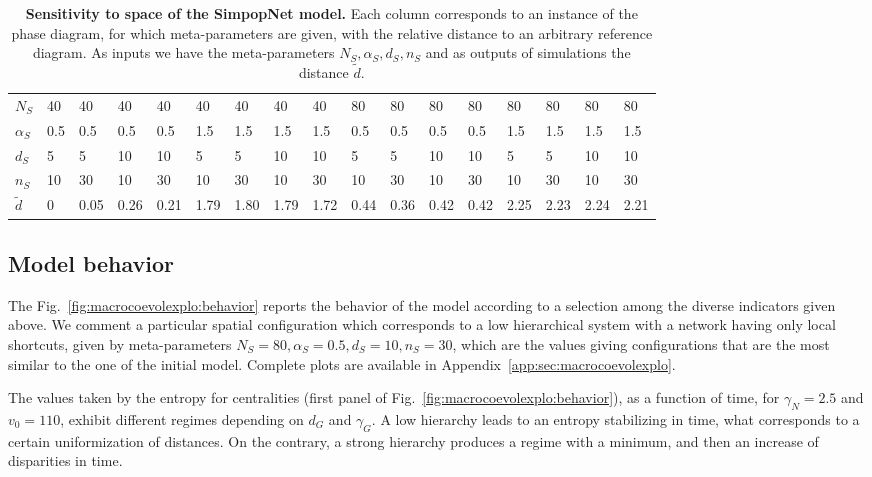 \begin{table}[!ht]
\caption{\textbf{Sensitivity to space of the SimpopNet model.} Each column corresponds to an instance of the phase diagram, for which meta-parameters are given, with the relative distance to an arbitrary reference diagram. As inputs we have the meta-parameters $N_S,\alpha_S,d_S,n_S$ and as outputs of simulations the distance $\tilde{d}$.\label{tab:macrocoevolexplo:spacematters}}
\begin{tabular}{|l|l|l|l|l|l|l|l|l|l|l|l|l|l|l|l|l|}
\hline
$N_S$ & 40 & 40 & 40 & 40 & 40 & 40 & 40 & 40 & 80 & 80 & 80 & 80 & 80 & 80 & 80 & 80\\
$\alpha_S$ & 0.5 & 0.5 & 0.5 & 0.5 & 1.5 & 1.5 & 1.5 & 1.5 & 0.5 & 0.5 & 0.5 & 0.5 & 1.5 & 1.5 & 1.5 & 1.5\\
$d_S$ & 5 & 5 & 10 & 10 & 5 & 5 & 10 & 10 & 5 & 5 & 10 & 10 & 5 & 5 & 10 & 10\\
$n_S$ & 10 & 30 & 10 & 30 & 10 & 30 & 10 & 30 & 10 & 30 & 10 & 30 & 10 & 30 & 10 & 30\\\hline
$\tilde{d}$ & 0 & 0.05 & 0.26 & 0.21 & 1.79 & 1.80 & 1.79 & 1.72 & 0.44 & 0.36 & 0.42 & 0.42 & 2.25 & 2.23 & 2.24 & 2.21\\\hline
\end{tabular}
\end{table}



\subsection{Model behavior}

The Fig.~\ref{fig:macrocoevolexplo:behavior} reports the behavior of the model according to a selection among the diverse indicators given above. We comment a particular spatial configuration which corresponds to a low hierarchical system with a network having only local shortcuts, given by meta-parameters $N_S=80,\alpha_S=0.5,d_S=10,n_S=30$, which are the values giving configurations that are the most similar to the one of the initial model. Complete plots are available in Appendix~\ref{app:sec:macrocoevolexplo}.


The values taken by the entropy for centralities (first panel of Fig.~\ref{fig:macrocoevolexplo:behavior}), as a function of time, for $\gamma_N = 2.5$ and $v_0 = 110$, exhibit different regimes depending on $d_G$ and $\gamma_G$. A low hierarchy leads to an entropy stabilizing in time, what corresponds to a certain uniformization of distances. On the contrary, a strong hierarchy produces a regime with a minimum, and then an increase of disparities in time.


